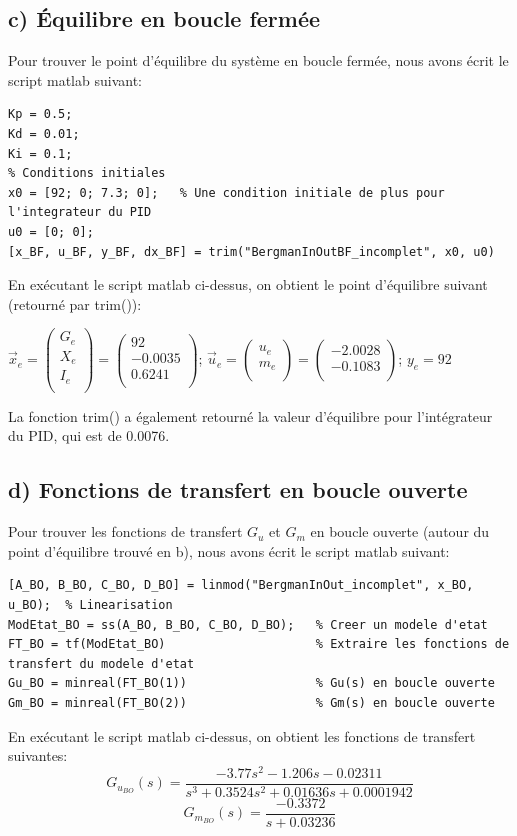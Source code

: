 \subsection*{c) Équilibre en boucle fermée}
Pour trouver le point d'équilibre du système en boucle fermée, nous avons écrit le script matlab suivant:
\begin{lstlisting}[style=matlab]
% On suppose que les valeurs des constantes du PID sont les suivantes
Kp = 0.5;
Kd = 0.01;
Ki = 0.1;
% Conditions initiales
x0 = [92; 0; 7.3; 0];   % Une condition initiale de plus pour l'integrateur du PID
u0 = [0; 0];
[x_BF, u_BF, y_BF, dx_BF] = trim("BergmanInOutBF_incomplet", x0, u0)
\end{lstlisting}
En exécutant le script matlab ci-dessus, on obtient le point d'équilibre suivant (retourné par trim()):\newline
\begin{center}
$\vec{x}_e=\begin{pmatrix}
G_e \\
X_e \\
I_e \\
\end{pmatrix}=
\begin{pmatrix}
92 \\
-0.0035 \\
0.6241 \\
\end{pmatrix}$; $\vec{u}_e=\begin{pmatrix}
u_e \\
m_e \\
\end{pmatrix}=\begin{pmatrix}
-2.0028 \\
-0.1083 \\
\end{pmatrix}$; $y_e=92$
\end{center}
La fonction trim() a également retourné la valeur d'équilibre pour l'intégrateur du PID, qui est de 0.0076.
\subsection*{d) Fonctions de transfert en boucle ouverte}
Pour trouver les fonctions de transfert $G_u$ et $G_m$ en boucle ouverte (autour du point d'équilibre trouvé en b), nous avons écrit le script matlab suivant:
\begin{lstlisting}[style=matlab]
[A_BO, B_BO, C_BO, D_BO] = linmod("BergmanInOut_incomplet", x_BO, u_BO);  % Linearisation
ModEtat_BO = ss(A_BO, B_BO, C_BO, D_BO);   % Creer un modele d'etat
FT_BO = tf(ModEtat_BO)                     % Extraire les fonctions de transfert du modele d'etat
Gu_BO = minreal(FT_BO(1))                  % Gu(s) en boucle ouverte
Gm_BO = minreal(FT_BO(2))                  % Gm(s) en boucle ouverte
\end{lstlisting}
En exécutant le script matlab ci-dessus, on obtient les fonctions de transfert suivantes:
$$\boxed{G_{u_{BO}}(s)=\frac{-3.77s^2-1.206s-0.02311}{s^3+0.3524s^2+0.01636s+0.0001942}}$$
$$\boxed{G_{m_{BO}}(s)=\frac{-0.3372}{s+0.03236}}$$

